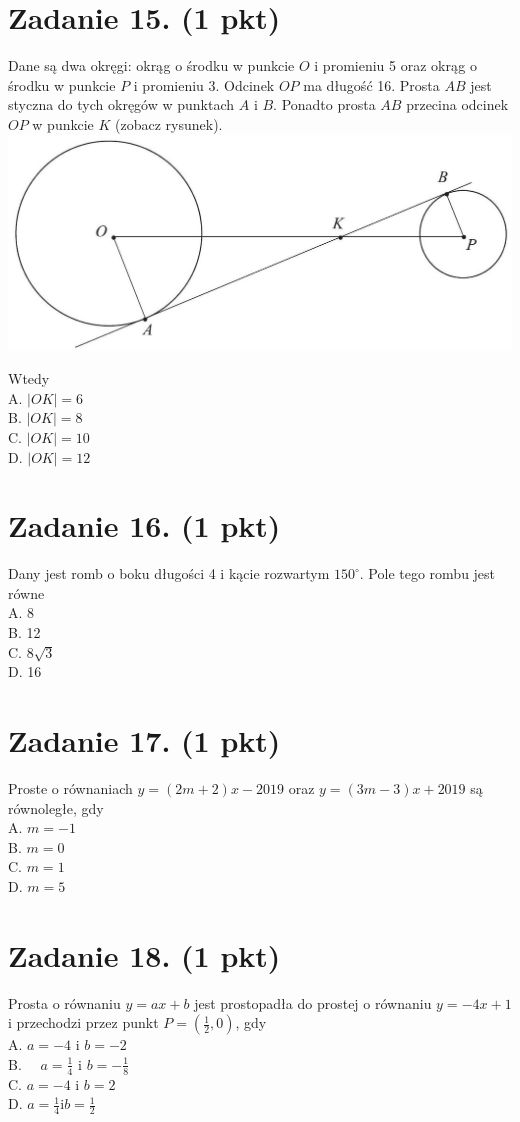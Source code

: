 \documentclass[10pt]{article}
\begin{document}
\section*{Zadanie 15. (1 pkt)}
Dane są dwa okręgi: okrąg o środku w punkcie \(O\) i promieniu 5 oraz okrąg o środku w punkcie \(P\) i promieniu 3. Odcinek \(O P\) ma długość 16. Prosta \(A B\) jest styczna do tych okręgów w punktach \(A\) i \(B\). Ponadto prosta \(A B\) przecina odcinek \(O P\) w punkcie \(K\) (zobacz rysunek).\\
\includegraphics[max width=\textwidth, center]{2024_11_21_d51d653f4fe4a5bb0c33g-08}

Wtedy\\
A. \(|O K|=6\)\\
B. \(|O K|=8\)\\
C. \(|O K|=10\)\\
D. \(|O K|=12\)

\section*{Zadanie 16. (1 pkt)}
Dany jest romb o boku długości 4 i kącie rozwartym \(150^{\circ}\). Pole tego rombu jest równe\\
A. 8\\
B. 12\\
C. \(8 \sqrt{3}\)\\
D. 16

\section*{Zadanie 17. (1 pkt)}
Proste o równaniach \(y=(2 m+2) x-2019\) oraz \(y=(3 m-3) x+2019\) są równoległe, gdy\\
A. \(m=-1\)\\
B. \(m=0\)\\
C. \(m=1\)\\
D. \(m=5\)

\section*{Zadanie 18. (1 pkt)}
Prosta o równaniu \(y=a x+b\) jest prostopadła do prostej o równaniu \(y=-4 x+1\) i przechodzi przez punkt \(P=\left(\frac{1}{2}, 0\right)\), gdy\\
A. \(a=-4\) i \(b=-2\)\\
B. \(\quad a=\frac{1}{4}\) i \(b=-\frac{1}{8}\)\\
C. \(a=-4\) i \(b=2\)\\
D. \(a=\frac{1}{4} \mathrm{i} b=\frac{1}{2}\)
\end{document}
